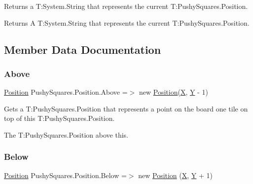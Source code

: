 Returns a T\+:\+System.\+String that represents the current T\+:\+Pushy\+Squares.\+Position. 

\begin{DoxyReturn}{Returns}
A T\+:\+System.\+String that represents the current T\+:\+Pushy\+Squares.\+Position.
\end{DoxyReturn}


\subsection{Member Data Documentation}
\mbox{\label{struct_pushy_squares_1_1_position_a02a1050a7cfc56b9b52eb1a63a9d72aa}} 
\subsubsection{\texorpdfstring{Above}{Above}}
{\footnotesize\ttfamily \hyperlink{struct_pushy_squares_1_1_position}{Position} Pushy\+Squares.\+Position.\+Above =$>$ new \hyperlink{struct_pushy_squares_1_1_position}{Position}(\hyperlink{struct_pushy_squares_1_1_position_a35115084c01a6abc427fcebe771d6a87}{X}, \hyperlink{struct_pushy_squares_1_1_position_a976a349430fe3bdf57db6eb77f9b0b84}{Y} -\/ 1)}



Gets a T\+:\+Pushy\+Squares.\+Position that represents a point on the board one tile on top of this T\+:\+Pushy\+Squares.\+Position. 

The T\+:\+Pushy\+Squares.\+Position above this.\mbox{\label{struct_pushy_squares_1_1_position_a6a6a8513eda2a0eec5e1b8a514b905db}} 
\subsubsection{\texorpdfstring{Below}{Below}}
{\footnotesize\ttfamily \hyperlink{struct_pushy_squares_1_1_position}{Position} Pushy\+Squares.\+Position.\+Below =$>$ new \hyperlink{struct_pushy_squares_1_1_position}{Position} (\hyperlink{struct_pushy_squares_1_1_position_a35115084c01a6abc427fcebe771d6a87}{X}, \hyperlink{struct_pushy_squares_1_1_position_a976a349430fe3bdf57db6eb77f9b0b84}{Y} + 1)}



